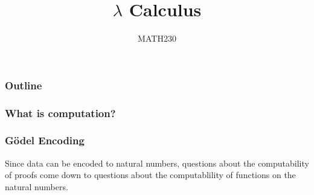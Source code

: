 \documentclass{beamer}
\title{$\lambda$ Calculus}
\author{MATH230}
\institute{Te Kura P\=angarau \\ Te Whare W\=ananga o Waitaha}
\date{}
\begin{document}
\begin{frame}

  \titlepage

\end{frame}

\begin{frame}
  \frametitle{Outline}

  \tableofcontents

\end{frame}

\begin{frame}
	\frametitle{What is computation?}
	
	

	

\end{frame}

\begin{frame}
	\frametitle{G\"{o}del Encoding}

	Since data can be encoded to natural numbers, questions about the computability of proofs come down to questions about the computablility of functions on the natural numbers. 

\end{frame}
\end{document}

